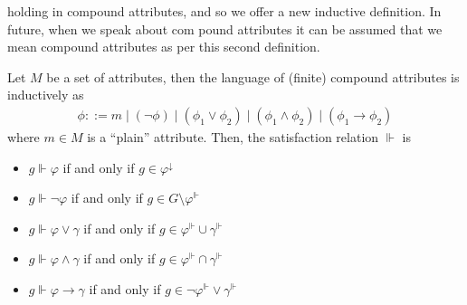 holding in compound attributes, and so we offer a new inductive definition. In future, when we speak about com pound
attributes it can be assumed that we mean compound attributes as per this second definition.
\begin{definition}
	\label{definition:compound-attributes-2} Let $M$ be a set of attributes, then the language of (finite) compound
	attributes is inductively as
	\begin{align}
		\phi ::= m \mid (\neg \phi) \mid (\phi_{1}\lor \phi_{2}) \mid (\phi_{1}\land \phi_{2}) \mid (\phi_{1}\rightarrow \phi_{2})
	\end{align}
	where $m \in M$ is a ``plain'' attribute. Then, the satisfaction relation $\Vdash$ is

	\begin{itemize}
		\item $g \Vdash \varphi$ if and only if $g \in \varphi^{\downarrow}$

		\item $g \Vdash \neg \varphi$ if and only if $g \in G \setminus \varphi^{\Vdash}$

		\item $g \Vdash \varphi \lor \gamma$ if and only if $g \in \varphi^{\Vdash}\cup \gamma^{\Vdash}$

		\item $g \Vdash \varphi \land \gamma$ if and only if $g \in \varphi^{\Vdash}\cap \gamma^{\Vdash}$

		\item $g \Vdash \varphi \rightarrow \gamma$ if and only if $g \in \neg \varphi^{\Vdash}\lor \gamma^{\Vdash}$
	\end{itemize}
\end{definition}
